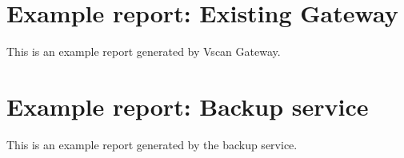 \section{Example report: Existing Gateway}
\label{existingGatewayReport}
%

This is an example report generated by Vscan Gateway.


% 




\section{Example report: Backup service}
\label{dummyServiceReport}

This is an example report generated by the backup service.

